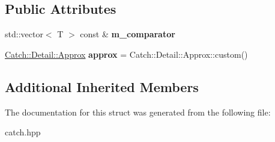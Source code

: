 \subsection*{Public Attributes}
\begin{DoxyCompactItemize}
\item 
\mbox{\label{structCatch_1_1Matchers_1_1Vector_1_1ApproxMatcher_a1394b5913d30bdd1147e1941fc41af56}} 
std\+::vector$<$ T $>$ const  \& {\bfseries m\+\_\+comparator}
\item 
\mbox{\label{structCatch_1_1Matchers_1_1Vector_1_1ApproxMatcher_a5515447af58adb5dc48a5d300b9ae162}} 
\hyperlink{classCatch_1_1Detail_1_1Approx}{Catch\+::\+Detail\+::\+Approx} {\bfseries approx} = Catch\+::\+Detail\+::\+Approx\+::custom()
\end{DoxyCompactItemize}
\subsection*{Additional Inherited Members}


The documentation for this struct was generated from the following file\+:\begin{DoxyCompactItemize}
\item 
catch.\+hpp\end{DoxyCompactItemize}
